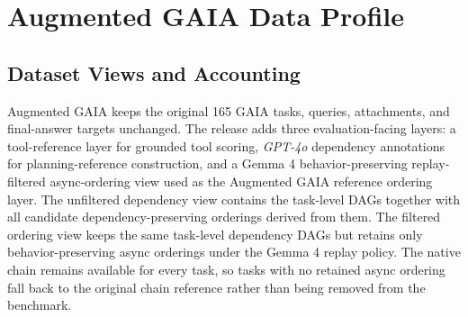 \documentclass{article}
\providecommand{\model}[1]{\emph{#1}}
\begin{document}
\FloatBarrier

\section{Augmented GAIA Data Profile}
\label{sec:appendix-data-profile}

\subsection{Dataset Views and Accounting}
\label{subsec:appendix-data-accounting}

Augmented GAIA keeps the original 165 GAIA tasks, queries, attachments, and final-answer targets unchanged. The release adds three evaluation-facing layers: a tool-reference layer for grounded tool scoring, \model{GPT-4o} dependency annotations for planning-reference construction, and a Gemma 4 behavior-preserving replay-filtered async-ordering view used as the Augmented GAIA reference ordering layer. 
The unfiltered dependency view contains the task-level DAGs together with all candidate dependency-preserving orderings derived from them. The filtered ordering view keeps the same task-level dependency DAGs but retains only behavior-preserving async orderings under the Gemma 4 replay policy. The native chain remains available for every task, so tasks with no retained async ordering fall back to the original chain reference rather than being removed from the benchmark.
\end{document}
